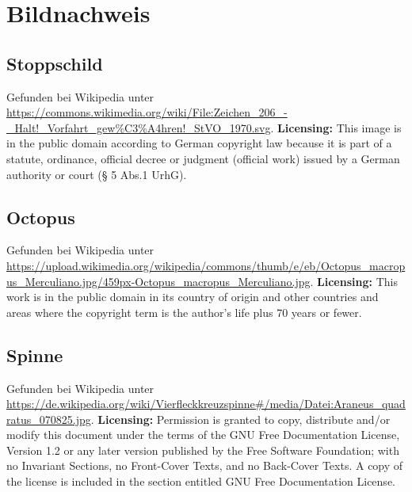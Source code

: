 \documentclass[a4paper]{amsart}
\theoremstyle{definition}
\begin{document}
\section{Bildnachweis}
\subsection{Stoppschild}
Gefunden bei Wikipedia unter \url{https://commons.wikimedia.org/wiki/File:Zeichen_206_-_Halt!_Vorfahrt_gew%C3%A4hren!_StVO_1970.svg}. \textbf{Licensing:} This image is in the public domain according to German copyright law because it is part of a statute, ordinance, official decree or judgment (official work) issued by a German authority or court (§ 5 Abs.1 UrhG).

\subsection{Octopus}
Gefunden bei Wikipedia unter \url{https://upload.wikimedia.org/wikipedia/commons/thumb/e/eb/Octopus_macropus_Merculiano.jpg/459px-Octopus_macropus_Merculiano.jpg}. \textbf{Licensing:} This work is in the public domain in its country of origin and other countries and areas where the copyright term is the author's life plus 70 years or fewer.


\subsection{Spinne}
Gefunden bei Wikipedia unter \url{https://de.wikipedia.org/wiki/Vierfleckkreuzspinne#/media/Datei:Araneus_quadratus_070825.jpg}. \textbf{Licensing:} Permission is granted to copy, distribute and/or modify this document under the terms of the GNU Free Documentation License, Version 1.2 or any later version published by the Free Software Foundation; with no Invariant Sections, no Front-Cover Texts, and no Back-Cover Texts. A copy of the license is included in the section entitled GNU Free Documentation License.
\end{document}
